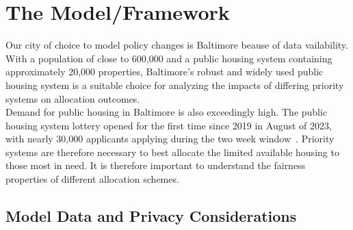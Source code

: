 \documentclass[11pt]{article}
\begin{document}
\newpage
\section{The Model/Framework}
\noindent
Our city of choice to model policy changes is Baltimore beause of data vailability. With a population of close to 600,000 and a public housing system containing approximately 20,000 properties, Baltimore's robust and widely used public housing system is a suitable choice for analyzing the impacts of differing priority systems on allocation outcomes. \\
\newline
Demand for public housing in Baltimore is also exceedingly high. The public housing system lottery opened for the first time since 2019 in August of 2023, with nearly 30,000 applicants applying during the two week window~\cite{emily_hofstaedter_28000_nodate}. Priority systems are therefore necessary to best allocate the limited available housing to those most in need.  It is therefore important to understand the fairness properties of different allocation schemes. \\

\subsection{Model Data and Privacy Considerations}
\end{document}
